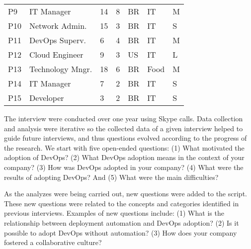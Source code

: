 \begin{table}[t]
\begin{tabular}{p{0.4cm}p{2.6cm}p{0.4cm}p{0.45cm}p{0.5cm}p{1.3cm}p{0.3cm}}
P9                   & IT Manager            & 14           & 8           & BR            & IT                 & M                               \\ \centering

P10                  & Network Admin.        & 15           & 3           & BR            & IT                 & S                               \\ \centering

P11                  & DevOps Superv.                & 6            & 4           & BR            & IT                  & M                               \\ \centering

P12                  & Cloud Engineer              & 9            & 3           & US            & IT                  & L                               \\ \centering

P13                  & Technology Mngr.                 & 18            & 6           & BR            & Food                  & M                               \\ \centering

P14                  & IT Manager            & 7            & 2           & BR            & IT                  & S                               \\ \centering

P15                  & Developer        & 3            & 2           & BR            & IT                  & S \\ \bottomrule
\end{tabular}
\end{table}



The interview were conducted over one year using Skype calls.
Data collection and analysis were iterative so the collected data of a given interview helped to guide
future interviews, and thus questions evolved according to
the progress of the research. We start with five open-ended questions: (1) What
motivated the adoption of DevOps? (2) What DevOps adoption means in the context of
your company? (3) How was DevOps adopted in your company? (4) What were the
results of adopting DevOps? And (5) What were the main difficulties?

As the analyzes were being carried out, new questions were added to the script.
These new questions were related to the concepts and categories identified in
previous interviews. Examples of new questions include: (1) What is the
relationship between deployment automation and DevOps adoption? (2) Is it
possible to adopt DevOps without automation? (3) How does your company fostered a collaborative culture?

